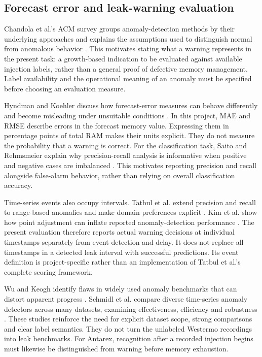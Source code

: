 \documentclass[10pt,a4paper,twocolumn]{article}
\begin{document}
\subsection{Forecast error and leak-warning evaluation}

Chandola et al.'s ACM survey groups anomaly-detection methods by their underlying approaches and explains the assumptions used to distinguish normal from anomalous behavior \cite{ref40}. This motivates stating what a warning represents in the present task: a growth-based indication to be evaluated against available injection labels, rather than a general proof of defective memory management. Label availability and the operational meaning of an anomaly must be specified before choosing an evaluation measure.

Hyndman and Koehler discuss how forecast-error measures can behave differently and become misleading under unsuitable conditions \cite{ref41}. In this project, MAE and RMSE describe errors in the forecast memory value. Expressing them in percentage points of total RAM makes their units explicit. They do not measure the probability that a warning is correct. For the classification task, Saito and Rehmsmeier explain why precision-recall analysis is informative when positive and negative cases are imbalanced \cite{ref42}. This motivates reporting precision and recall alongside false-alarm behavior, rather than relying on overall classification accuracy.

Time-series events also occupy intervals. Tatbul et al. extend precision and recall to range-based anomalies and make domain preferences explicit \cite{ref43}. Kim et al. show how point adjustment can inflate reported anomaly-detection performance \cite{ref44}. The present evaluation therefore reports actual warning decisions at individual timestamps separately from event detection and delay. It does not replace all timestamps in a detected leak interval with successful predictions. Its event definition is project-specific rather than an implementation of Tatbul et al.'s complete scoring framework.

Wu and Keogh identify flaws in widely used anomaly benchmarks that can distort apparent progress \cite{ref45}. Schmidl et al. compare diverse time-series anomaly detectors across many datasets, examining effectiveness, efficiency and robustness \cite{ref46}. These studies reinforce the need for explicit dataset scope, strong comparisons and clear label semantics. They do not turn the unlabeled Westermo recordings into leak benchmarks. For Antarex, recognition after a recorded injection begins must likewise be distinguished from warning before memory exhaustion.
\end{document}
